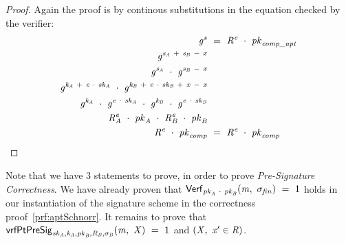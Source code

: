 \begin{proof}
    \label{prf:aptSchnorr}
    Again the proof is by continous substitutions in the equation checked by the verifier:
    \begin{align}
        \mathit{g}^{\mathit{s}} &~=~ \mathit{R}^{\mathit{e}} ~\cdot~ \mathit{pk}_{\mathit{comp\_apt}} \\
        \mathit{g}^{\mathit{s}_{\mathit{A}} ~+~ \mathit{s}_{\mathit{B}} ~-~ \mathit{x}} & \\
        \mathit{g}^{\mathit{s}_{\mathit{A}}} ~\cdot~ \mathit{g}^{\mathit{s}_{\mathit{B}} ~-~ \mathit{x}} & \\
        \mathit{g}^{\mathit{\mathit{k}_{\mathit{A}}} ~+~ \mathit{e} ~\cdot~ \mathit{sk}_{\mathit{A}}} ~\cdot~ \mathit{g}^{\mathit{\mathit{k}_{\mathit{B}}} ~+~ \mathit{e} ~\cdot~ \mathit{sk}_{\mathit{B}} ~+~ \mathit{x} ~-~ \mathit{x}} & \\
        \mathit{g}^{\mathit{\mathit{k}_{\mathit{A}}}} ~\cdot~ \mathit{g}^{\mathit{e} ~\cdot~ \mathit{sk}_{\mathit{A}}} ~\cdot~ \mathit{g}^{\mathit{\mathit{k}_{\mathit{B}}}} ~\cdot~ \mathit{g}^{\mathit{e} ~\cdot~ \mathit{sk}_{\mathit{B}}} & \\
        \mathit{R}_{\mathit{A}}^{\mathit{e}} ~\cdot~ \mathit{pk}_{\mathit{A}} ~\cdot~ \mathit{R}_{\mathit{B}}^{\mathit{e}} ~\cdot~ \mathit{pk}_{\mathit{B}} & \\
        \mathit{R}^{\mathit{e}} ~\cdot~ \mathit{pk}_{\mathit{comp}} & ~=~ \mathit{R}^{\mathit{e}} ~\cdot~ \mathit{pk}_{\mathit{comp}}
    \end{align}
\end{proof}

Note that we have 3 statements to prove, in order to prove \textit{Pre-Signature Correctness}.
We have already proven that $\mathsf{Verf}_{\mathit{pk}_{\mathit{A}} ~\cdot~ \mathit{pk}_{\mathit{B}}}(\mathit{m} ,~ \sigma_{\mathit{fin}}) ~=~ 1$ holds in our instantiation of the signature scheme in the
correctness proof~\ref{prf:aptSchnorr}.
It remains to prove that $\mathsf{vrfPtPreSig}_{\mathit{sk}_{\mathit{A}},\mathit{\mathit{k}_{\mathit{A}}},\mathit{pk}_{\mathit{B}},\mathit{R}_{\mathit{B}},\sigma_{\mathit{B}}}(\mathit{m} ,~ \mathit{X}) ~=~ 1$ and
$(\mathit{X} ,~ \mathit{x}' \in \mathit{R})$.

